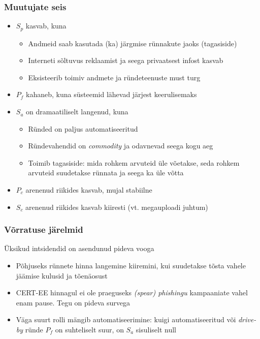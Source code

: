 \begin{frame}[fragile]
  \frametitle{Muutujate seis}
	\begin{itemize}
		\item $S_p$ kasvab, kuna 
			\begin{itemize}
				\item Andmeid saab kasutada (ka) järgmise rünnakute jaoks (tagasiside) 
				\item Interneti sõltuvus reklaamist ja seega privaatsest infost kasvab
				\item Eksisteerib toimiv andmete ja ründeteenuste must turg
			\end{itemize}
		\item $P_f$ kahaneb, kuna süsteemid lähevad järjest keerulisemaks
		\item $S_a$ on dramaatiliselt langenud, kuna 
			\begin{itemize}
				\item Ründed on paljus automatiseeritud
				\item Ründevahendid on \emph{commodity} ja odavnevad seega kogu aeg
				\item Toimib tagasiside: mida rohkem arvuteid üle võetakse, seda rohkem arvuteid suudetakse rünnata ja seega ka üle võtta
			\end{itemize}
		\item $P_c$ arenenud riikides kasvab, mujal stabiilne
		\item $S_c$ arenenud riikides kasvab kiiresti (vt. megauploadi juhtum)
	\end{itemize}
\end{frame}


\begin{frame}[fragile]
  \frametitle{Võrratuse järelmid}
	Üksikud intsidendid on asendunud pideva vooga
	\begin{itemize}
		\item Põhjuseks rünnete hinna langemine kiiremini, kui suudetakse tõsta vahele jäämise kulusid ja tõenäosust
		\item CERT-EE hinnagul ei ole praeguseks \emph{(spear) phishingu} kampaaniate vahel enam pause. Tegu on pideva survega
		\item Väga suurt rolli mängib automatiseerimine: kuigi automatiseeritud või \emph{drive-by} ründe $P_f$ on suhteliselt suur, on $S_a$ sisuliselt null
	\end{itemize}
\end{frame}

